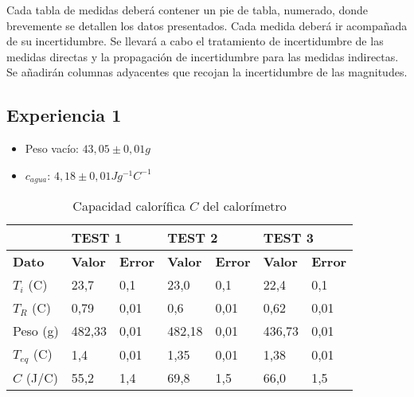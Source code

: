 \documentclass[a4paper,12pt,spanish]{article}
\begin{document}
	Cada tabla de medidas deberá contener un pie de tabla,
	numerado, donde brevemente se detallen los datos presentados. Cada medida
	deberá ir acompañada de su incertidumbre. Se llevará a cabo el tratamiento de
	incertidumbre de las medidas directas y la propagación de incertidumbre para las
	medidas indirectas. Se añadirán columnas adyacentes que recojan la
	incertidumbre de las magnitudes.
	
	\subsection{Experiencia 1}%
	
	\begin{itemize}
		\item Peso vacío: $43,05 \pm 0,01 \si{g}$
		\item $c_{agua}$: $4,18\pm 0,01 \si{Jg^{-1}C^{-1}}$
	\end{itemize}


\begin{table}[h!]
	\centering
	\begin{tabular}{l|ll|lll|lll|}
		\cline{2-9}
		\textbf{}                               & \multicolumn{2}{l|}{\textbf{TEST 1}}                 & \multicolumn{3}{l|}{\textbf{TEST 2}}                      & \multicolumn{3}{l|}{\textbf{TEST 3}}                      \\ \hline
		\multicolumn{1}{|l|}{\textbf{Dato}}     & \multicolumn{1}{l|}{\textbf{Valor}} & \textbf{Error} & \multicolumn{2}{l|}{\textbf{Valor}} & \textbf{Error}      & \multicolumn{2}{l|}{\textbf{Valor}} & \textbf{Error}      \\ \hline\hline
		\multicolumn{1}{|l|}{$T_i$ (C)}    & \multicolumn{1}{l|}{23,7}           & 0,1           & \multicolumn{2}{l|}{23,0}             & 0,1                & \multicolumn{2}{l|}{22,4}           & 0,1                \\ \hline
		\multicolumn{1}{|l|}{$T_R$ (C)}    & \multicolumn{1}{l|}{0,79}           & 0,01           & \multicolumn{2}{l|}{0,6}            & 0,01                & \multicolumn{2}{l|}{0,62}           & 0,01                \\ \hline
		\multicolumn{1}{|l|}{Peso (g)}     & \multicolumn{1}{l|}{482,33}         & 0,01           & \multicolumn{2}{l|}{482,18}         & 0,01                & \multicolumn{2}{l|}{436,73}         & 0,01                \\ \hline
		\multicolumn{1}{|l|}{$T_{eq}$ (C)} & \multicolumn{1}{l|}{1,4}            & 0,01           & \multicolumn{2}{l|}{1,35}           & 0,01                & \multicolumn{2}{l|}{1,38}           & 0,01                \\ \hline\hline
		\multicolumn{1}{|l|}{$C$ (J/C)}      & \multicolumn{1}{l|}{55,2}           & 1,4            & \multicolumn{2}{l|}{69,8}           & 1,5                 & \multicolumn{2}{l|}{66,0}           & 1,5                 \\ \hline
	\end{tabular}
	\caption{Capacidad calorífica $C$ del calorímetro}
\end{table}
	
\end{document}
